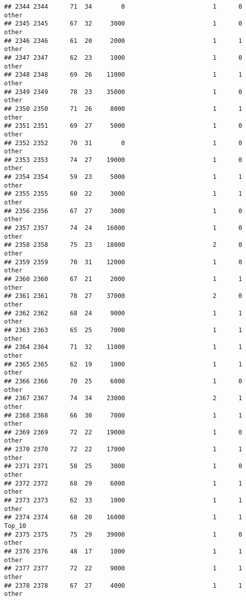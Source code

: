 \documentclass[
]{article}
\begin{document}
\begin{verbatim}
## 2344 2344      71  34        0                        1      0    other
## 2345 2345      67  32     3000                        1      0    other
## 2346 2346      61  20     2000                        1      1    other
## 2347 2347      62  23     1000                        1      0    other
## 2348 2348      69  26    11000                        1      1    other
## 2349 2349      78  23    35000                        1      0    other
## 2350 2350      71  26     8000                        1      1    other
## 2351 2351      69  27     5000                        1      0    other
## 2352 2352      70  31        0                        1      0    other
## 2353 2353      74  27    19000                        1      0    other
## 2354 2354      59  23     5000                        1      1    other
## 2355 2355      60  22     3000                        1      1    other
## 2356 2356      67  27     3000                        1      0    other
## 2357 2357      74  24    16000                        1      0    other
## 2358 2358      75  23    18000                        2      0    other
## 2359 2359      70  31    12000                        1      0    other
## 2360 2360      67  21     2000                        1      1    other
## 2361 2361      78  27    37000                        2      0    other
## 2362 2362      68  24     9000                        1      1    other
## 2363 2363      65  25     7000                        1      1    other
## 2364 2364      71  32    11000                        1      1    other
## 2365 2365      62  19     1000                        1      1    other
## 2366 2366      70  25     6000                        1      0    other
## 2367 2367      74  34    23000                        2      1    other
## 2368 2368      66  30     7000                        1      1    other
## 2369 2369      72  22    19000                        1      0    other
## 2370 2370      72  22    17000                        1      1    other
## 2371 2371      58  25     3000                        1      0    other
## 2372 2372      68  29     6000                        1      1    other
## 2373 2373      62  33     1000                        1      1    other
## 2374 2374      68  20    16000                        1      1   Top_10
## 2375 2375      75  29    39000                        1      0    other
## 2376 2376      48  17     1000                        1      1    other
## 2377 2377      72  22     9000                        1      1    other
## 2378 2378      67  27     4000                        1      1    other

\end{verbatim}
\end{document}
